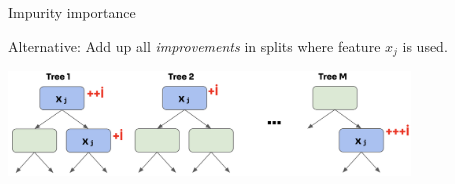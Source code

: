 \documentclass[11pt,compress,t,notes=noshow, xcolor=table]{beamer}
\begin{document}
\begin{vbframe}{Impurity importance}

{\small Alternative: Add up all \textit{improvements} in splits where feature $x_j$ is used.}

\vspace{-1ex}
\begin{center}
\includegraphics[width=0.8\textwidth]{figure_man/forest-fimp_impurity.png}
\end{center}

\begin{algorithm}[H]
\small
\begin{algorithmic}[1]
  \EndFor
  \EndFor
\end{algorithmic}
\end{algorithm}

\end{vbframe}
\end{document}
